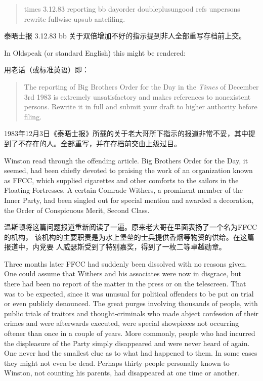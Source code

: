 \begin{paracol}{2}
\switchcolumn*

\begin{quotation}
times 3.12.83 reporting bb dayorder doubleplusungood refs unpersons
rewrite fullwise upsub antefiling.
\end{quotation}

\switchcolumn

泰晤士报 3.12.83 bb 关于双倍增加不好的指示提到非人全部重写存档前上交。

\switchcolumn*

In Oldspeak (or standard English) this might be rendered:

\switchcolumn

用老话（或标准英语）即：

\switchcolumn*

\begin{quotation}
The reporting of Big Brother\textquotesingle s Order for the Day in the
\emph{Times} of December 3rd 1983 is extremely unsatisfactory and makes
references to nonexistent persons. Rewrite it in full and submit your
draft to higher authority before filing.
\end{quotation}

\switchcolumn

1983年12月3日《泰晤士报》所载的关于老大哥所下指示的报道非常不妥，其中提到了不存在的人。全部重写，并在存档前交由上级过目。

\switchcolumn*

Winston read through the offending article. Big
Brother\textquotesingle s Order for the Day, it seemed, had been chiefly
devoted to praising the work of an organization known as FFCC, which
supplied cigarettes and other comforts to the sailors in the Floating
Fortresses. A certain Comrade Withers, a prominent member of the Inner
Party, had been singled out for special mention and awarded a
decoration, the Order of Conspicuous Merit, Second Class.

\switchcolumn

温斯顿将这篇问题报道重新阅读了一遍。原来老大哥在里面表扬了一个名为FFCC的机构，
该机构的主要职责是为水上堡垒的士兵提供香烟等物资的供给。在这篇报道中，内党要
人威瑟斯受到了特别嘉奖，得到了一枚二等卓越勋章。

\switchcolumn*

Three months later FFCC had suddenly been dissolved with no reasons
given. One could assume that Withers and his associates were now in
disgrace, but there had been no report of the matter in the press or on
the telescreen. That was to be expected, since it was unusual for
political offenders to be put on trial or even publicly denounced. The
great purges involving thousands of people, with public trials of
traitors and thought-criminals who made abject confession of their
crimes and were afterwards executed, were special showpieces not
occurring oftener than once in a couple of years. More commonly, people
who had incurred the displeasure of the Party simply disappeared and
were never heard of again. One never had the smallest clue as to what
had happened to them. In some cases they might not even be dead. Perhaps
thirty people personally known to Winston, not counting his parents, had
disappeared at one time or another.


\end{paracol}
